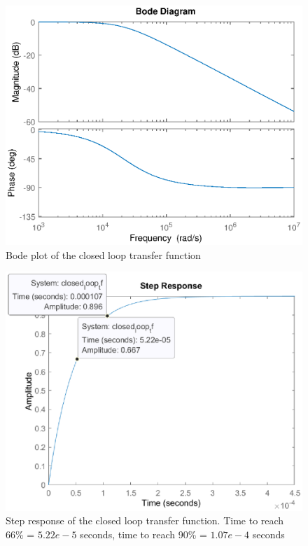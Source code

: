 \documentclass{report}
\begin{document}
\begin{figure}[h]
\centering
\includegraphics[scale=0.6]{motor_closed_loop_bode}	
\caption{Bode plot of the closed loop transfer function}
\label{fig:motor_closed_loop_bode}
\end{figure}

\begin{figure}[h]
\centering
\includegraphics[scale=0.6]{motor_closed_loop_step_response}	
\caption{Step response of the closed loop transfer function. Time to reach 66\% = $5.22e-5$ seconds, time to reach 90\% = $1.07e-4$ seconds }
\label{fig:motor_closed_loop_step_response}
\end{figure}
\end{document}
